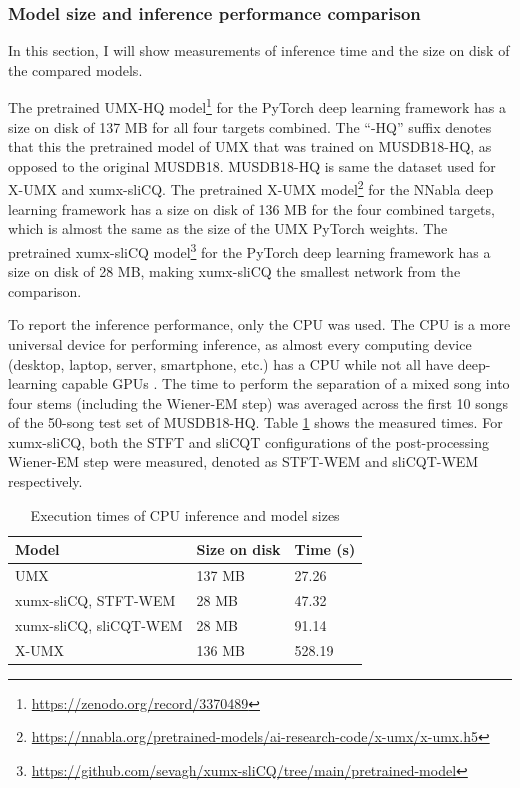 \documentclass[report.tex]{subfiles}
\begin{document}
\newpagefill

\subsubsection{Model size and inference performance comparison}
\label{sec:inferenceperf}

In this section, I will show measurements of inference time and the size on disk of the compared models.

The pretrained UMX-HQ model\footnote{\url{https://zenodo.org/record/3370489}} for the PyTorch deep learning framework has a size on disk of 137 MB for all four targets combined. The ``-HQ'' suffix denotes that this the pretrained model of UMX that was trained on MUSDB18-HQ, as opposed to the original MUSDB18. MUSDB18-HQ is same the dataset used for X-UMX and xumx-sliCQ. The pretrained X-UMX model\footnote{\url{https://nnabla.org/pretrained-models/ai-research-code/x-umx/x-umx.h5}} for the NNabla deep learning framework has a size on disk of 136 MB for the four combined targets, which is almost the same as the size of the UMX PyTorch weights. The pretrained xumx-sliCQ model\footnote{\url{https://github.com/sevagh/xumx-sliCQ/tree/main/pretrained-model}} for the PyTorch deep learning framework has a size on disk of 28 MB, making xumx-sliCQ the smallest network from the comparison.

To report the inference performance, only the CPU was used. The CPU is a more universal device for performing inference, as almost every computing device (desktop, laptop, server, smartphone, etc.) has a CPU while not all have deep-learning capable GPUs \parencite{deepcpuinf, deepcpuinf2}. The time to perform the separation of a mixed song into four stems (including the Wiener-EM step) was averaged across the first 10 songs of the 50-song test set of MUSDB18-HQ. Table \ref{table:infperf} shows the measured times. For xumx-sliCQ, both the STFT and sliCQT configurations of the post-processing Wiener-EM step were measured, denoted as STFT-WEM and sliCQT-WEM respectively.

\begin{table}[ht]
	\centering
	\caption{Execution times of CPU inference and model sizes}
	\label{table:infperf}
	\begin{tabular}{ |l|l|l| }
	 \hline
		Model & Size on disk & Time (s) \\
	 \hline
	 \hline
		UMX & 137 MB & 27.26 \\
	 \hline
		xumx-sliCQ, STFT-WEM & 28 MB & 47.32 \\
	 \hline
		xumx-sliCQ, sliCQT-WEM & 28 MB & 91.14 \\
	 \hline
		X-UMX & 136 MB & 528.19 \\
	 \hline
\end{tabular}
\end{table}
\end{document}
